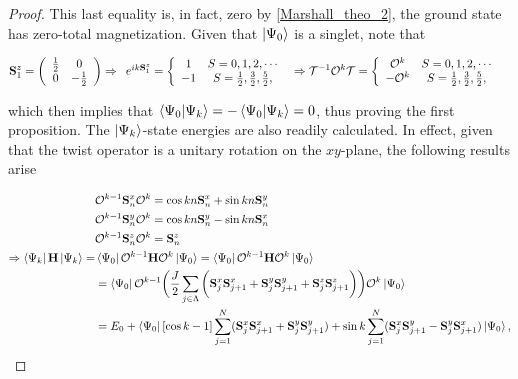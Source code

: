 \documentclass{homework}
\begin{document}
\begin{proof}
This last equality is, in fact, zero by \cref{Marshall_theo_2}, the ground state has zero-total magnetization. Given that $\ket{\Psi_0}$ is a singlet, note that 

\begin{equation}
\begin{split}
    {\bf S}_1^z &= \left(\begin{array}{cc}
        \frac{1}{2} & 0  \\
        0 & -\frac{1}{2} 
    \end{array}\right) \Rightarrow \begin{array}{c}
        e^{ik {\bf S}_1^z}  = \left\{  \begin{array}{cc}
              1 &  S = 0,1,2,\cdots \\
              -1 &  S = \frac{1}{2},\frac{3}{2},\frac{5}{2},
          \end{array} \right.
    \end{array} \Rightarrow \mathcal{T}^{-1} \mathcal{O}^{k} \mathcal{T} = \left\{  \begin{array}{cc}
              \mathcal{O}^{k} &  S = 0,1,2,\cdots \\
              -\mathcal{O}^{k} &  S = \frac{1}{2},\frac{3}{2},\frac{5}{2},
          \end{array} \right.
\end{split}
\end{equation}

which then implies that $\bra{\Psi_0} \ket{\Psi_k} = - \bra{\Psi_0} \ket{\Psi_k} = 0$, thus proving the first proposition. The $\ket{\Psi_k}$-state energies are also readily calculated. In effect, given that the twist operator is a unitary rotation on the $xy$-plane, the following results arise 

\begin{equation}
\begin{split}
     &\mathcal{O}^{k-1} {\bf S}^x_n \mathcal{O}^{k} = \cos kn {\bf S}_n^x + \sin kn {\bf S}_n^y  \\
     &\mathcal{O}^{k-1} {\bf S}^y_n \mathcal{O}^{k} = \cos kn {\bf S}_n^y - \sin kn {\bf S}_n^x  \\
     &\mathcal{O}^{k-1} {\bf S}^z_n \mathcal{O}^{k} = {\bf S}^z_n \\
     \Rightarrow \bra{\Psi_k} {{\bf H}} \ket{\Psi_k} = & \bra{\Psi_0} \mathcal{O}^{k-1} {{\bf H}} \mathcal{O}^{k} \ket{\Psi_0} = \bra{\Psi_0} \mathcal{O}^{k-1} {{\bf H}} \mathcal{O}^{k} \ket{\Psi_0} \\
     &= \bra{\Psi_0} \mathcal{O}^{k-1} \bigg( \frac{J}{2} \sum_{j \in \Lambda} \bigg({\bf S}_j^x {\bf S}_{j+1}^x + {\bf S}_j^y {\bf S}_{j+1}^y + {\bf S}_j^z {\bf S}_{j+1}^z \bigg) \bigg) \mathcal{O}^{k} \ket{\Psi_0} \\
     &= E_0 + \bra{\Psi_0} [\cos k - 1] \sum_{j=1}^N ({\bf S}_j^x {\bf S}_{j+1}^x + {\bf S}_j^y {\bf S}_{j+1}^y) + \sin k \sum_{j=1}^N ({\bf S}_j^x {\bf S}_{j+1}^y - {\bf S}_j^y {\bf S}_{j+1}^x) \ket{\Psi_0}, \\
\end{split} 
\end{equation}


\end{proof}
\end{document}
